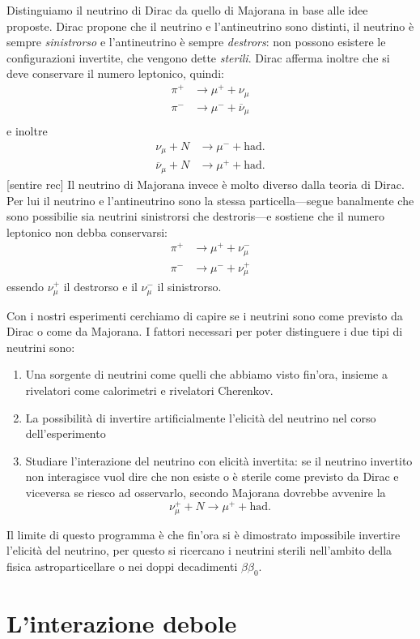             Distinguiamo il neutrino di Dirac da quello di Majorana in base alle idee proposte. Dirac propone che il neutrino e l'antineutrino sono distinti, il neutrino è sempre \emph{sinistrorso} e l'antineutrino è sempre \emph{destrors}: non possono esistere le configurazioni invertite, che vengono dette \emph{sterili}. Dirac afferma inoltre che si deve conservare il numero leptonico, quindi:
            \begin{align*}
                \pi^+ &\rightarrow \mu^+ + \nu_\mu\\
                \pi^- &\rightarrow \mu^- + \overline{\nu}_\mu\\
            \end{align*}
            e inoltre
            \begin{align*}
                \nu_\mu + N &\rightarrow \mu^- + \text{had.}\\
                \overline{\nu}_\mu + N &\rightarrow \mu^+ + \text{had.}
            \end{align*}
            [sentire rec]
            Il neutrino di Majorana invece è molto diverso dalla teoria di Dirac. Per lui il neutrino e l'antineutrino sono la stessa particella---segue banalmente che sono possibilie sia neutrini sinistrorsi che destroris---e sostiene che il numero leptonico non debba conservarsi:
            \begin{align*}
                \pi^+ &\rightarrow \mu^+ + \nu_\mu^-\\
                \pi^- &\rightarrow \mu^- + \nu_\mu^+
            \end{align*}
            essendo $\nu_\mu^+$ il destrorso e il $\nu_\mu^-$ il sinistrorso.

            Con i nostri esperimenti cerchiamo di capire se i neutrini sono come previsto da Dirac o come da Majorana. I fattori necessari per poter distinguere i due tipi di neutrini sono:
            \begin{enumerate}
                \item Una sorgente di neutrini come quelli che abbiamo visto fin'ora, insieme a rivelatori come calorimetri e rivelatori Cherenkov.
                \item La possibilità di invertire artificialmente l'elicità del neutrino nel corso dell'esperimento
                \item Studiare l'interazione del neutrino con elicità invertita: se il neutrino invertito non interagisce vuol dire che non esiste o è sterile come previsto da Dirac e viceversa se riesco ad osservarlo, secondo Majorana dovrebbe avvenire la
                \begin{equation}
                    \nu_\mu^+ + N \rightarrow \mu^+ + \text{had.}
                \end{equation}
            \end{enumerate}
            Il limite di questo programma è che fin'ora si è dimostrato impossibile invertire l'elicità del neutrino, per questo si ricercano i neutrini sterili nell'ambito della fisica astroparticellare o nei doppi decadimenti $\beta\beta_0$.
    \section{L'interazione debole}